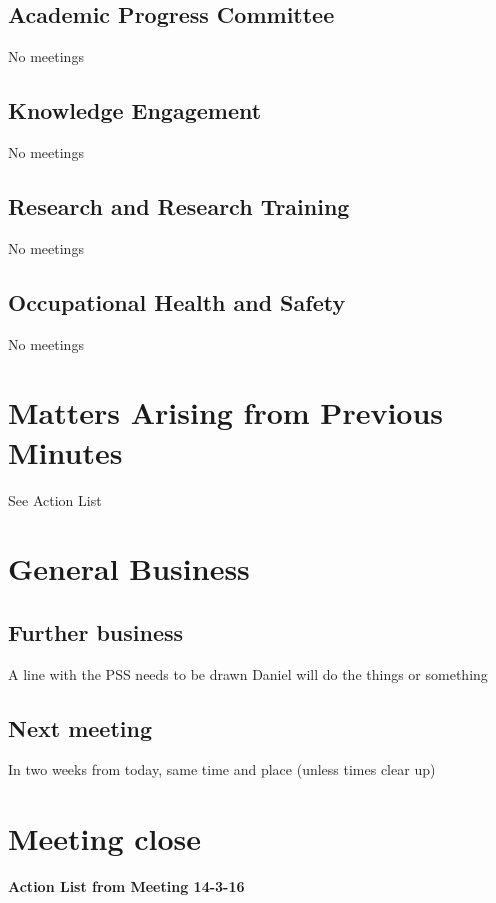 \documentclass[a4paper,11pt]{article}
\begin{document}
\subsection{Academic Progress Committee}
No meetings
\subsection{Knowledge Engagement}
No meetings
\subsection{Research and Research Training}
No meetings
\subsection{Occupational Health and Safety}
No meetings

\section{Matters Arising from Previous Minutes}
See Action List
\section{General Business}
\subsection{Further business}
A line with the PSS needs to be drawn
Daniel will do the things or something

\subsection{Next meeting}
In two weeks from today, same time and place (unless times clear up)

\section{Meeting close}


\pagebreak
{\Large \textbf{Action List from Meeting 14-3-16}}
\end{document}
